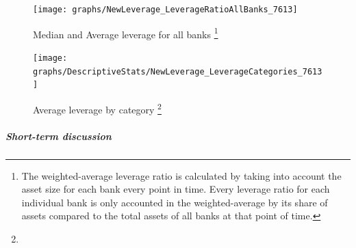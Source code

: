 \documentclass[12pt, a4paper]{article} %
\begin{document}
\begin{figure}[H]
\begin{minipage}{\textwidth}
\centering
\caption[1]{Median and Average leverage for all banks \footnote{The weighted-average leverage ratio is calculated by taking into account the asset size for each bank every point in time. Every leverage ratio for each individual bank is only accounted in the weighted-average by its share of assets compared to the total assets of all banks at that point of time.}}
\texttt{[image: graphs/NewLeverage\_LeverageRatioAllBanks\_7613]}
\label{fig:averageLeverage}
\end{minipage}
\end{figure}

\begin{figure}[H]
\begin{minipage}{\textwidth}
\centering
\caption[1]{Average leverage by category \footnote{}}
\texttt{[image: graphs/DescriptiveStats/NewLeverage\_LeverageCategories\_7613]}
\label{fig:averageLeverage_Categories}
\end{minipage}
\end{figure}

\subparagraph{Short-term discussion} 
\end{document}
